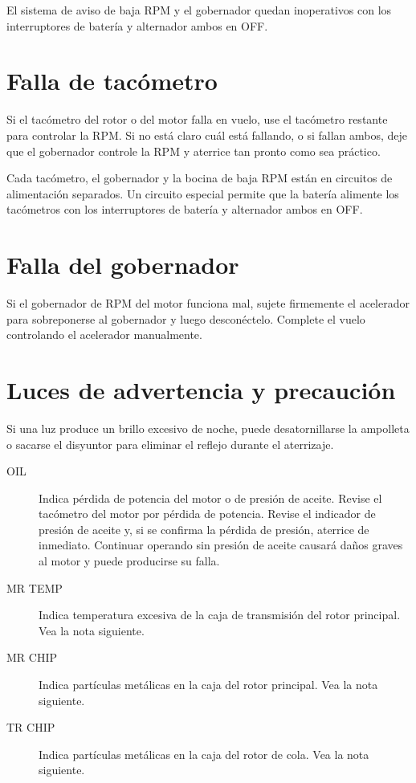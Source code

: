 \begin{precaucion}
El sistema de aviso de baja RPM y el gobernador quedan inoperativos con los interruptores de batería y alternador ambos en OFF.
\end{precaucion}

\section{Falla de tacómetro}

Si el tacómetro del rotor o del motor falla en vuelo, use el tacómetro restante para controlar la RPM. Si no está claro cuál está fallando, o si fallan ambos, deje que el gobernador controle la RPM y aterrice tan pronto como sea práctico.

\begin{nota}
Cada tacómetro, el gobernador y la bocina de baja RPM están en circuitos de alimentación separados. Un circuito especial permite que la batería alimente los tacómetros con los interruptores de batería y alternador ambos en OFF.
\end{nota}

\section{Falla del gobernador}

Si el gobernador de RPM del motor funciona mal, sujete firmemente el acelerador para sobreponerse al gobernador y luego desconéctelo. Complete el vuelo controlando el acelerador manualmente.

\section{Luces de advertencia y precaución}

\begin{nota}
Si una luz produce un brillo excesivo de noche, puede desatornillarse la ampolleta o sacarse el disyuntor para eliminar el reflejo durante el aterrizaje.
\end{nota}

\begin{description}
\item[\textsf{OIL}] Indica pérdida de potencia del motor o de presión de aceite. Revise el tacómetro del motor por pérdida de potencia. Revise el indicador de presión de aceite y, si se confirma la pérdida de presión, aterrice de inmediato. Continuar operando sin presión de aceite causará daños graves al motor y puede producirse su falla.
\item[\textsf{MR TEMP}] Indica temperatura excesiva de la caja de transmisión del rotor principal. Vea la nota siguiente.
\item[\textsf{MR CHIP}] Indica partículas metálicas en la caja del rotor principal. Vea la nota siguiente.
\item[\textsf{TR CHIP}] Indica partículas metálicas en la caja del rotor de cola. Vea la nota siguiente.
\end{description}

